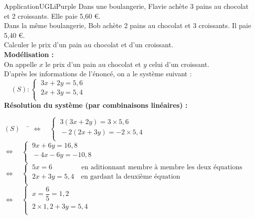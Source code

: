 \documentclass[a4paper,11pt,cours]{nsi}
\begin{document}
\begin{encadrecolore}{Application}{UGLiPurple}
	Dans une boulangerie, Flavie achète 3 pains au chocolat et 2 croissants. Elle paie 5,60 €.\\
	Dans la même boulangerie, Bob achète 2 pains au chocolat et 3 croissants. Il paie 5,40 €.\\
	Calculer le prix d'un pain au chocolat et d'un croissant.\\
	
	\textbf{Modélisation :}\\
	On appelle $x$ le prix d'un pain au chocolat et $y$ celui d'un croissant.\\
	D'après les informations de l'énoncé, on a le système suivant : $\quad (S):\left\{
	\begin{array}{l}
		\ 3x+2y=5,6 \\
		\ 2x+3y=5,4 \\
	\end{array} \right.$\\[1em]
	\textbf{Résolution du système (par combinaisons linéaires) :}
	\begin{tabbing}
		$(S) \quad$		\=	$\Leftrightarrow\quad \left\{
		\begin{array}{l}
			\ 3(3x+2y)=3\times 5,6 \\
			\ -2(2x+3y)=-2\times 5,4 \\
		\end{array} \right.$\\[1em]
		
		\>	$\Leftrightarrow\quad \left\{
		\begin{array}{l}
			\ 9x+6y=16,8 \\
			\ -4x-6y=-10,8 \\
		\end{array} \right. $\\[1em]
	
		\>	$\Leftrightarrow\quad \left\{
		\begin{array}{l}
			\ 5x=6\qquad \qquad \ \text{en aditionnant membre à membre les deux équations} \\
			\ 2x+3y=5,4 \quad \text{en gardant la deuxième équation} \\
		\end{array} \right. $\\[1em]
		
		\>	$\Leftrightarrow\quad \left\{
		\begin{array}{l}
			\ x=\dfrac{6}{5}=1,2 \\
			\ 2\times 1,2 + 3y=5,4 \\
		\end{array} \right. $\\[1em]
	

\end{tabbing}
\end{encadrecolore}
\end{document}
